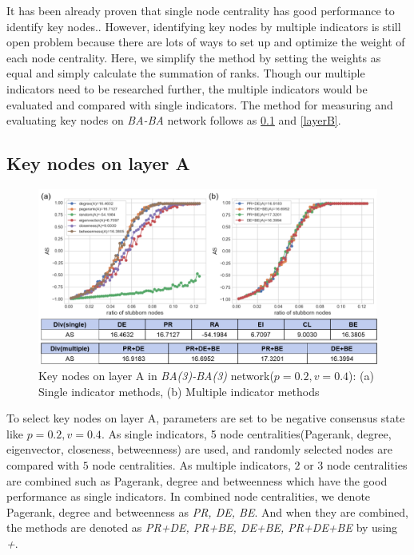 It has been already proven that single node centrality has good performance to identify key nodes.\parencite{koschutzki2008, francisco2019, bianconi2018}. However, identifying key nodes by multiple indicators is still open problem because there are lots of ways to set up and optimize the weight of each node centrality.\parencite{huang2014}  Here, we simplify the method by setting the weights as equal and simply calculate the summation of ranks. Though our multiple indicators need to be researched further, the multiple indicators would be evaluated and compared with single indicators. The method for measuring and evaluating key nodes on \textit{BA-BA} network follows as \ref{layerA} and \ref{layerB}.\\
 
\subsection{Key nodes on layer A}
\label{layerA}
\begin{figure}[!htb]
	\centering
	\includegraphics[width=\hsize]{figure/chap5_keynode_A.png}
	\caption{Key nodes on layer A in \textit{BA(3)-BA(3)} network($p=0.2, v=0.4$): (a) Single indicator methods, (b) Multiple indicator methods}
	\label{chap5_keynode_A}
\end{figure}
To select key nodes on layer A, parameters are set to be negative consensus state like $p=0.2, v=0.4$.  As single indicators, 5 node centralities(Pagerank, degree, eigenvector, closeness, betweenness) are used, and randomly selected nodes are compared with $5$ node centralities. As multiple indicators, $2$ or $3$ node centralities are combined such as Pagerank, degree and betweenness which have the good performance as single indicators. In combined node centralities, we denote Pagerank, degree and betweenness as \textit{PR, DE, BE}. And when they are combined, the methods are denoted as \textit{PR+DE, PR+BE, DE+BE, PR+DE+BE} by using \textit{+}. 

